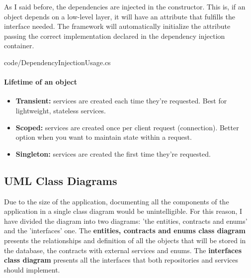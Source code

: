             As I said before, the dependencies are injected in the constructor. This is, if an object depends on a low-level layer, it will have 
            an attribute that fulfills the interface needed. The framework will automatically initialize the attribute passing the correct 
            implementation declared in the dependency injection container.
            
            {code/DependencyInjectionUsage.cs}

            \paragraph{Lifetime of an object}
                \begin{itemize}[noitemsep]
                    \item \textbf{Transient:} services are created each time they're requested. Best for lightweight, stateless services.
                    \item \textbf{Scoped:} services are created once per client request (connection). Better option when you want to maintain state within a request.
                    \item \textbf{Singleton:} services are created the first time they're requested.
                \end{itemize}
    
    \subsection{UML Class Diagrams}
        Due to the size of the application, documenting all the components of the application in a single class diagram would be 
        unintelligible. For this reason, I have divided the diagram into two diagrams: 'the entities, contracts and enums' and the 'interfaces' one.
        The \textbf{entities, contracts and enums class diagram} presents the relationships and definition of all the objects that will be stored in the database, 
        the contracts with external services and enums.
        The \textbf{interfaces class diagram} presents all the interfaces that both repositories and services should implement. 
    
